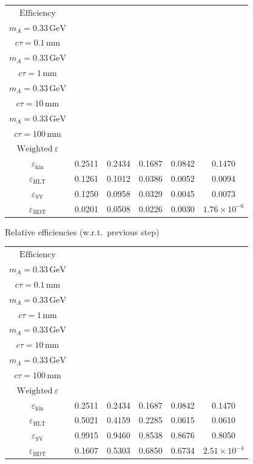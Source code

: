 \documentclass[10pt,a4paper]{article}
\begin{document}
{\begin{tabular}{cccccc}
\toprule
$\mathrm{Efficiency}$ & \shortstack{$m_{\pi}=1\,\mathrm{GeV}$\\$m_{A}=0.33\,\mathrm{GeV}$\\$c\tau=0.1\,\mathrm{mm}$} & \shortstack{$m_{\pi}=1\,\mathrm{GeV}$\\$m_{A}=0.33\,\mathrm{GeV}$\\$c\tau=1\,\mathrm{mm}$} & \shortstack{$m_{\pi}=1\,\mathrm{GeV}$\\$m_{A}=0.33\,\mathrm{GeV}$\\$c\tau=10\,\mathrm{mm}$} & \shortstack{$m_{\pi}=1\,\mathrm{GeV}$\\$m_{A}=0.33\,\mathrm{GeV}$\\$c\tau=100\,\mathrm{mm}$} & \shortstack{$\mathrm{QCD}$\\$\mathrm{Weighted}\ \varepsilon$} \\
\midrule
$\varepsilon_{\mathrm{kin}}$ & 0.2511 & 0.2434 & 0.1687 & 0.0842 & 0.1470\\
$\varepsilon_{\mathrm{HLT}}$ & 0.1261 & 0.1012 & 0.0386 & 0.0052 & 0.0094\\
$\varepsilon_{\mathrm{SV}}$ & 0.1250 & 0.0958 & 0.0329 & 0.0045 & 0.0073\\
$\varepsilon_{\mathrm{BDT}}$ & 0.0201 & 0.0508 & 0.0226 & 0.0030 & $1.76\times10^{-6}$\\
\bottomrule
\end{tabular}

\vspace{18pt}

Relative efficiencies (w.r.t.\ previous step)

\begin{tabular}{cccccc}
\toprule
$\mathrm{Efficiency}$ & \shortstack{$m_{\pi}=1\,\mathrm{GeV}$\\$m_{A}=0.33\,\mathrm{GeV}$\\$c\tau=0.1\,\mathrm{mm}$} & \shortstack{$m_{\pi}=1\,\mathrm{GeV}$\\$m_{A}=0.33\,\mathrm{GeV}$\\$c\tau=1\,\mathrm{mm}$} & \shortstack{$m_{\pi}=1\,\mathrm{GeV}$\\$m_{A}=0.33\,\mathrm{GeV}$\\$c\tau=10\,\mathrm{mm}$} & \shortstack{$m_{\pi}=1\,\mathrm{GeV}$\\$m_{A}=0.33\,\mathrm{GeV}$\\$c\tau=100\,\mathrm{mm}$} & \shortstack{$\mathrm{QCD}$\\$\mathrm{Weighted}\ \varepsilon$} \\
\midrule
$\varepsilon_{\mathrm{kin}}$ & 0.2511 & 0.2434 & 0.1687 & 0.0842 & 0.1470\\
$\varepsilon_{\mathrm{HLT}}$ & 0.5021 & 0.4159 & 0.2285 & 0.0615 & 0.0610\\
$\varepsilon_{\mathrm{SV}}$ & 0.9915 & 0.9460 & 0.8538 & 0.8676 & 0.8050\\
$\varepsilon_{\mathrm{BDT}}$ & 0.1607 & 0.5303 & 0.6850 & 0.6734 & $2.51\times10^{-4}$\\
\bottomrule
\end{tabular}

}
\end{document}
